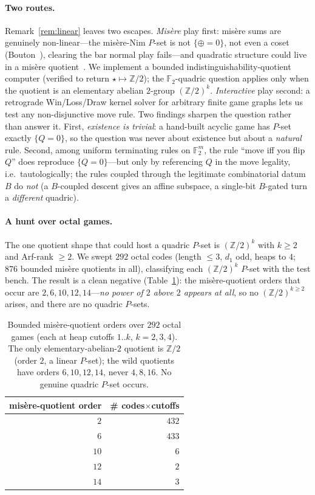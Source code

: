 \documentclass[11pt]{article}
\theoremstyle{definition}
\newcommand{\F}{\mathbb{F}}
\begin{document}
\paragraph{Two routes.}
Remark~\ref{rem:linear} leaves two escapes. \emph{Misère} play first: misère sums
are genuinely non-linear---the misère-Nim $P$-set is not $\{\oplus=0\}$, not even
a coset (Bouton~\cite{Bouton}), clearing the bar normal play fails---and quadratic
structure could live in a misère quotient~\cite{PS,WW}. We implement a bounded
indistinguishability-quotient computer (verified to return $\star\mapsto\mathbb{Z}/2$);
the $\F_2$-quadric question applies only when the quotient is an elementary abelian
$2$-group $(\mathbb{Z}/2)^k$. \emph{Interactive} play second: a retrograde
Win/Loss/Draw kernel solver for arbitrary finite game graphs lets us test any
non-disjunctive move rule. Two findings sharpen the question rather than answer it.
First, \emph{existence is trivial}: a hand-built acyclic game has $P$-set exactly
$\{Q=0\}$, so the question was never about existence but about a \emph{natural}
rule. Second, among uniform terminating rules on $\F_2^m$, the rule ``move iff you
flip $Q$'' does reproduce $\{Q=0\}$---but only by referencing $Q$ in the move
legality, i.e.\ tautologically; the rules coupled through the legitimate
combinatorial datum $B$ do \emph{not} (a $B$-coupled descent gives an affine
subspace, a single-bit $B$-gated turn a \emph{different} quadric).

\paragraph{A hunt over octal games.}
The one quotient shape that could host a quadric $P$-set is $(\mathbb{Z}/2)^k$
with $k\ge 2$ and Arf-rank $\ge 2$. We swept $292$ octal codes (length $\le 3$,
$d_1$ odd, heaps to $4$; $876$ bounded misère quotients in all), classifying each
$(\mathbb{Z}/2)^k$ $P$-set with the test bench. The result is a clean negative
(Table~\ref{tab:hunt}): the misère-quotient orders that occur are
$2,6,10,12,14$---\emph{no power of $2$ above $2$ appears at all}, so no
$(\mathbb{Z}/2)^{k\ge2}$ arises, and there are no quadric $P$-sets.

\begin{table}[h]
\centering
\begin{tabular}{rr}
\toprule
misère-quotient order & \# codes$\times$cutoffs \\
\midrule
$2$  & $432$ \\
$6$  & $433$ \\
$10$ & $6$ \\
$12$ & $2$ \\
$14$ & $3$ \\
\bottomrule
\end{tabular}
\caption{Bounded misère-quotient orders over $292$ octal games (each at heap
cutoffs $1..k$, $k=2,3,4$). The only elementary-abelian-$2$ quotient is
$\mathbb{Z}/2$ (order $2$, a linear $P$-set); the wild quotients have orders
$6,10,12,14$, never $4,8,16$. No genuine quadric $P$-set occurs.}
\label{tab:hunt}
\end{table}
\end{document}
